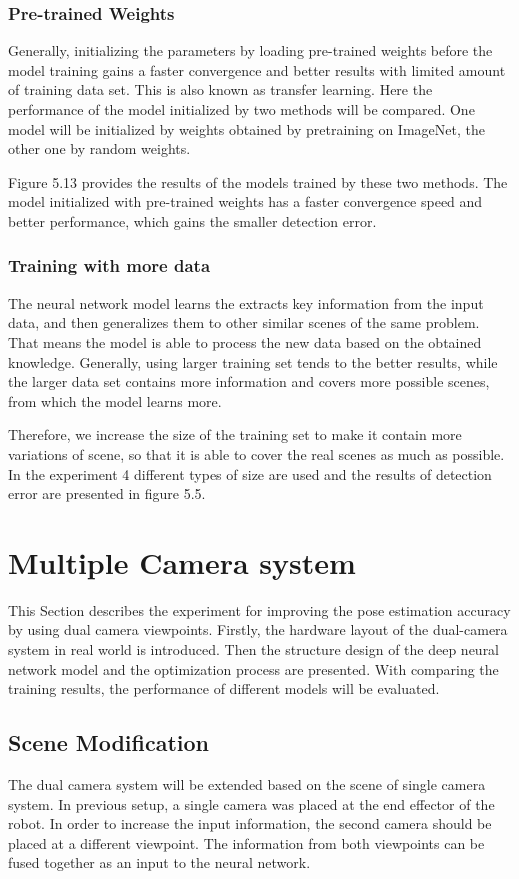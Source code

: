 \subsubsection*{Pre-trained Weights}
Generally, initializing the parameters by loading pre-trained weights before the model training gains a faster convergence and better results with limited amount of training data set. This is also known as transfer learning. Here the performance of the model initialized by two methods will be compared. One model will be initialized by weights obtained by pretraining on ImageNet, the other one by random weights.

\missingfigure{}
Figure 5.13 provides the results of the models trained by these two methods. The model initialized with pre-trained weights has a faster convergence speed and better performance, which gains the smaller detection error.

\subsubsection*{Training with more data}
The neural network model learns the extracts key information from the input data, and then generalizes them to other similar scenes of the same problem. That means the model is able to process the new data based on the obtained knowledge. Generally, using larger training set tends to the better results, while the larger data set contains more information and covers more possible scenes, from which the model learns more. 

Therefore, we increase the size of the training set to make it contain more variations of scene, so that it is able to cover the real scenes as much as possible.  In the experiment 4 different types of size are used and the results of detection error are presented in figure 5.5.
\missingfigure{} 


\section{Multiple Camera system}
This Section describes the experiment for improving the pose estimation accuracy by using dual camera viewpoints. Firstly, the hardware layout of the dual-camera system in real world is introduced. Then the structure design of the deep neural network model and the optimization process are presented. With comparing the training results, the performance of different models will be evaluated.


\subsection{Scene Modification}
The dual camera system will be extended based on the scene of single camera system. In previous setup, a single camera was placed at the end effector of the robot. In order to increase the input information, the second camera should be placed at a different viewpoint. The information from both viewpoints can be fused together as an input to the neural network.

